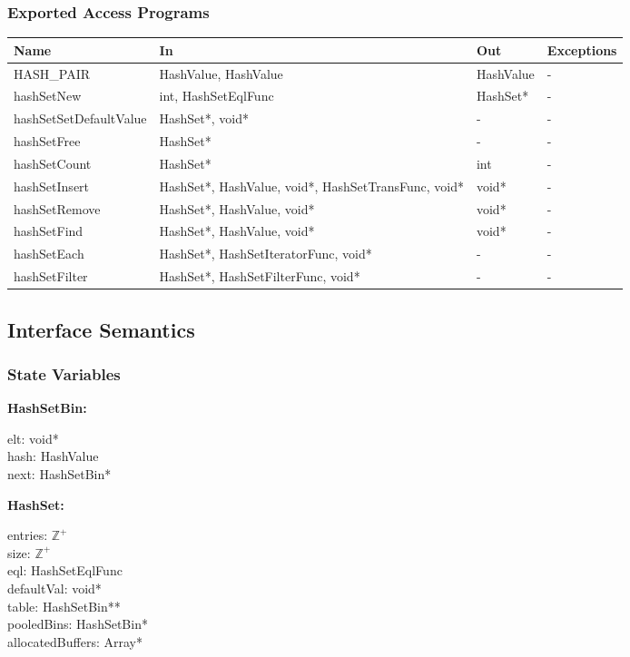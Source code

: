 \documentclass[12pt]{article}
\newcommand{\UZ}{$\mathbb{Z}^+$}
\begin{document}
\subsubsection{Exported Access Programs} \label{SecEAPAssoc}
	\renewcommand*{\arraystretch}{1.2}
	\begin{longtable}{| y | x{3.5cm} | y | x{3.5cm} |}
	\hline \textbf{Name} & \textbf{In} & \textbf{Out} & \textbf{Exceptions} \\ \hline
	HASH_PAIR & HashValue, HashValue & HashValue & - \\ \hline 
	hashSetNew & int, HashSetEqlFunc & HashSet* & - \\ \hline
	hashSetSetDefaultValue & HashSet*, void* & - & - \\ \hline
	hashSetFree & HashSet* & - & - \\ \hline
	hashSetCount & HashSet* & int & - \\ \hline
	hashSetInsert & HashSet*, HashValue, void*, HashSetTransFunc, void* & void* & - \\ \hline
	hashSetRemove & HashSet*, HashValue, void* & void* & - \\ \hline
	hashSetFind & HashSet*, HashValue, void* & void* & - \\ \hline
	hashSetEach & HashSet*, HashSetIteratorFunc, void* & - & - \\ \hline
	hashSetFilter & HashSet*, HashSetFilterFunc, void* & - & - \\ \hline
\end{longtable}

\subsection{Interface Semantics}

\subsubsection{State Variables} \label{SecSVAssoc}
\textbf{HashSetBin:} 
\begin{multicols}{3}
	\noindent elt: void* \\
	hash: HashValue \\
	next: HashSetBin*
\end{multicols}

\noindent \textbf{HashSet:} 
\begin{multicols}{3}
	\noindent entries: \UZ \\
	size: \UZ \\
	eql: HashSetEqlFunc \\
	defaultVal: void* \\
	table: HashSetBin** \\
	pooledBins: HashSetBin* \\
	allocatedBuffers: Array*
\end{multicols}
\end{document}
